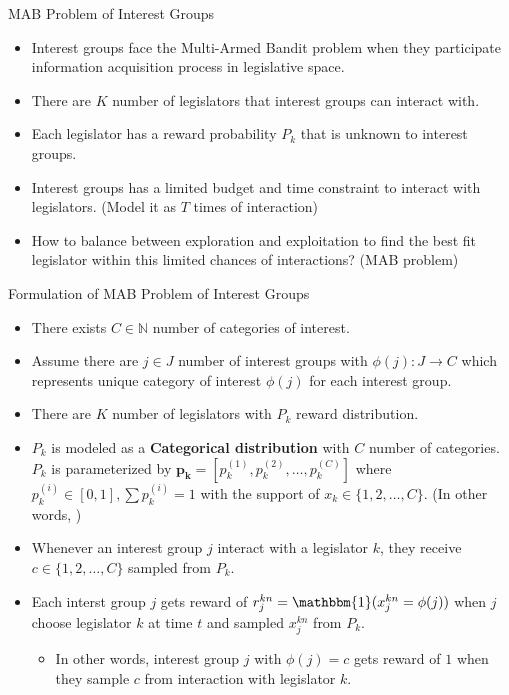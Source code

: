 \documentclass{beamer}
\begin{document}
	\begin{frame}{MAB Problem of Interest Groups}
		\begin{itemize}
			\item Interest groups face the Multi-Armed Bandit problem when they participate information acquisition process in legislative space.
			\item There are $K$ number of legislators that interest groups can interact with. 
			\item Each legislator has a reward probability $P_k$ that is unknown to interest groups.
			\item Interest groups has a limited budget and time constraint to interact with legislators. (Model it as $T$ times of interaction)
			\item How to balance between exploration and exploitation to find the best fit legislator within this limited chances of interactions? (MAB problem)
		\end{itemize}
	\end{frame}

	\begin{frame}{Formulation of MAB Problem of Interest Groups} 
		\begin{itemize}
			\item There exists $C \in \mathbb{N}$ number of categories of interest.
			\item Assume there are $j \in J$ number of interest groups with $\phi(j): J \rightarrow C$ which represents unique category of interest $\phi(j)$ for each interest group.
			\item There are $K$ number of legislators with $P_k$ reward distribution.
			\item $P_k$ is modeled as a \textbf{Categorical distribution} with $C$ number of categories. $P_k$ is parameterized by $\mathbf{p_k} = [p_k^{(1)}, p_k^{(2)}, \hdots, p_k^{(C)}]$ where $p_k^{(i)} \in [0,1], \sum{p_k^{(i)}}=1$ with the support of $x_k \in \{1,2,\hdots,C\}$.  
			(In other words, )
			\item Whenever an interest group $j$ interact with a legislator $k$, they receive $c \in \{1, 2, \hdots, C\}$ sampled from $P_k$.
			\item  Each interst group $j$ gets reward of $r_j^{kn} = \mathbbm{1}(x_j^{kn} = \phi(j))$ when $j$ choose legislator $k$ at time $t$ and sampled $x_j^{kn}$ from $P_k$. 
			\begin{itemize}
				\item In other words, interest group $j$ with $\phi(j) = c$ gets reward of $1$ when they sample $c$ from interaction with legislator $k$.
			\end{itemize}
		\end{itemize}
	\end{frame}
\end{document}
